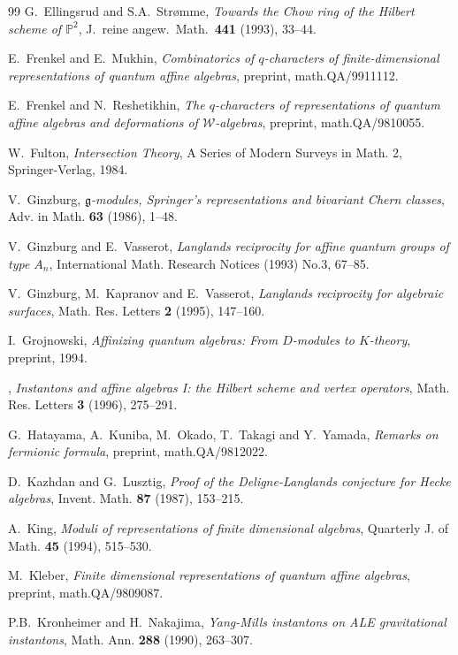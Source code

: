 \documentclass[12pt]{amsart}
\def\Bbb{\mathbb}
\theoremstyle{definition}
\theoremstyle{remark}
\numberwithin{equation}{subsection}
\begin{document}
\begin{thebibliography}{99}
 G.~Ellingsrud and S.A.~Str\o mme,
{\it Towards the Chow ring of the Hilbert scheme of ${\Bbb P}^2$},
J.\ reine angew.\ Math.\ {\bf 441} (1993), 33--44.

 E.~Frenkel and E.~Mukhin,
{\it Combinatorics of $q$-characters of finite-dimensional
representations of quantum affine algebras},
preprint, math.QA/9911112.

 E.~Frenkel and N.~Reshetikhin,
{\it The $q$-characters of representations of quantum affine algebras
and deformations of $\mathcal W$-algebras},
preprint, math.QA/9810055.

 W.~Fulton,
{\it Intersection Theory}, A Series of Modern Surveys in Math. 2,
Springer-Verlag, 1984.

 V.~Ginzburg,
{\it $\mathfrak g$-modules, Springer's representations and bivariant
Chern classes},
Adv. in Math. {\bf 63} (1986), 1--48.

 V.~Ginzburg and E.~Vasserot,
{\it Langlands reciprocity for affine quantum groups of type $A_n$},
International Math. Research Notices (1993) No.3, 67--85.

 V.~Ginzburg, M.~Kapranov and E.~Vasserot,
{\it Langlands reciprocity for algebraic surfaces},
Math. Res. Letters {\bf 2} (1995), 147--160.

 I.~Grojnowski,
{\it Affinizing quantum algebras: From $D$-modules to $K$-theory},
preprint, 1994.

 \bysame,
{\it Instantons and affine algebras I: the Hilbert scheme and vertex
operators}, Math. Res. Letters {\bf 3} (1996), 275--291.

 G.~Hatayama, A.~Kuniba, M.~Okado, T.~Takagi and
Y.~Yamada,
{\it Remarks on fermionic formula},
preprint, math.QA/9812022.

 D.~Kazhdan and G.~Lusztig,
{\it Proof of the Deligne-Langlands conjecture for Hecke algebras},
Invent. Math. {\bf 87} (1987), 153--215.

 A.~King,
 {\it Moduli of representations of finite dimensional algebras}, 
 Quarterly J. of Math. {\bf 45} (1994), 515--530.

 M.~Kleber,
{\it Finite dimensional representations of quantum affine algebras},
preprint, math.QA/9809087.

 P.B.~Kronheimer and H.~Nakajima,
 {\it Yang-Mills instantons on ALE gravitational instantons},
 Math. Ann. {\bf 288} (1990), 263--307.


\end{thebibliography}
\end{document}
